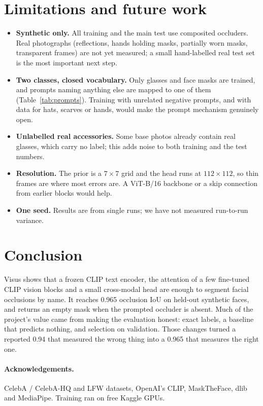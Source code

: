 \documentclass[11pt,a4paper]{article}
\begin{document}
\section{Limitations and future work}
\begin{itemize}
  \item \textbf{Synthetic only.} All training and the main test use composited occluders. Real
  photographs (reflections, hands holding masks, partially worn masks, transparent frames) are not yet
  measured; a small hand-labelled real test set is the most important next step.
  \item \textbf{Two classes, closed vocabulary.} Only glasses and face masks are trained, and prompts naming
  anything else are mapped to one of them (Table~\ref{tab:prompts}). Training with unrelated negative
  prompts, and with data for hats, scarves or hands, would make the prompt mechanism genuinely open.
  \item \textbf{Unlabelled real accessories.} Some base photos already contain real glasses, which carry no
  label; this adds noise to both training and the test numbers.
  \item \textbf{Resolution.} The prior is a $7\times7$ grid and the head runs at $112\times112$, so thin
  frames are where most errors are. A ViT-B/16 backbone or a skip connection from earlier blocks would
  help.
  \item \textbf{One seed.} Results are from single runs; we have not measured run-to-run variance.
\end{itemize}

\section{Conclusion}
Visus shows that a frozen CLIP text encoder, the attention of a few fine-tuned CLIP vision blocks and a
small cross-modal head are enough to segment facial occlusions by name. It reaches 0.965 occlusion IoU on
held-out synthetic faces, and returns an empty mask when the prompted occluder is absent. Much of the project's value
came from making the evaluation honest: exact labels, a baseline that predicts nothing, and selection on
validation. Those changes turned a reported 0.94 that measured the wrong thing into a 0.965 that
measures the right one.

\paragraph{Acknowledgements.}
CelebA / CelebA-HQ and LFW datasets, OpenAI's CLIP, MaskTheFace, dlib and MediaPipe. Training ran on
free Kaggle GPUs.
\end{document}
